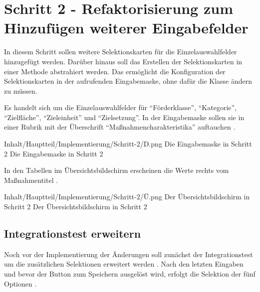 \chapter{Schritt 2 - Refaktorisierung zum Hinzufügen weiterer Eingabefelder}
\label{chap:Schritt-2}



In diesem Schritt sollen weitere Selektionskarten für die Einzelauswahlfelder hinzugefügt werden.
Darüber hinaus soll das Erstellen der Selektionskarten in einer Methode abstrahiert werden.
Das ermöglicht die Konfiguration der Selektionskarten in der aufrufenden Eingabemaske, ohne dafür die Klasse  ändern zu müssen.

Es handelt sich um die Einzelauswahlfelder für \enquote{Förderklasse}, \enquote{Kategorie}, \enquote{Zielfläche}, \enquote{Zieleinheit} und \enquote{Zielsetzung}.
In der Eingabemaske sollen sie in einer Rubrik mit der Überschrift \enquote{Maßnahmencharakteristika} auftauchen \Abb{\ref{fig:Schritt2Eingabemaske}}.



\begin{alexfigure}{Inhalt/Hauptteil/Implementierung/Schritt-2/D.png}
  {Die Eingabemaske in Schritt 2}
  {Die Eingabemaske in Schritt 2}

  \label{fig:Schritt2Eingabemaske}

\end{alexfigure}

\clearpage
In den Tabellen im Übersichtsbildschirm erscheinen  die Werte  rechts  vom Maßnahmentitel \Abb{\ref{fig:Schritt2Uebersicht}}.
\begin{alexfigure}{Inhalt/Hauptteil/Implementierung/Schritt-2/Ü.png}
  {Der Übersichtsbildschirm in Schritt 2}
  {Der Übersichtsbildschirm in Schritt 2}

  \label{fig:Schritt2Uebersicht}

\end{alexfigure}


\section{Integrationstest erweitern}

Noch vor der Implementierung der Änderungen soll zunächst der Integrationstest um die zusätzlichen Selektionen erweitert werden \Lst{\ref{lst:Schritt2IntegrationstestKlickt5WeitereKarten}}.
Nach den letzten Eingaben und bevor der Button zum Speichern ausgelöst wird, erfolgt die Selektion der fünf Optionen .

